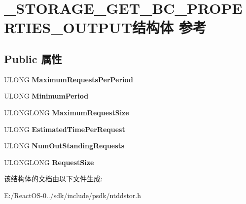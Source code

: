 \hypertarget{struct___s_t_o_r_a_g_e___g_e_t___b_c___p_r_o_p_e_r_t_i_e_s___o_u_t_p_u_t}{}\section{\+\_\+\+S\+T\+O\+R\+A\+G\+E\+\_\+\+G\+E\+T\+\_\+\+B\+C\+\_\+\+P\+R\+O\+P\+E\+R\+T\+I\+E\+S\+\_\+\+O\+U\+T\+P\+U\+T结构体 参考}
\label{struct___s_t_o_r_a_g_e___g_e_t___b_c___p_r_o_p_e_r_t_i_e_s___o_u_t_p_u_t}
\subsection*{Public 属性}
\begin{DoxyCompactItemize}
\item 
\mbox{\label{struct___s_t_o_r_a_g_e___g_e_t___b_c___p_r_o_p_e_r_t_i_e_s___o_u_t_p_u_t_a7eb7df608c5769f332262dba8b2c2fe4}} 
U\+L\+O\+NG {\bfseries Maximum\+Requests\+Per\+Period}
\item 
\mbox{\label{struct___s_t_o_r_a_g_e___g_e_t___b_c___p_r_o_p_e_r_t_i_e_s___o_u_t_p_u_t_a00579ef0c7ecb8bdb8e67627313455f2}} 
U\+L\+O\+NG {\bfseries Minimum\+Period}
\item 
\mbox{\label{struct___s_t_o_r_a_g_e___g_e_t___b_c___p_r_o_p_e_r_t_i_e_s___o_u_t_p_u_t_a24116cab618e5621155d16bd96fcb980}} 
U\+L\+O\+N\+G\+L\+O\+NG {\bfseries Maximum\+Request\+Size}
\item 
\mbox{\label{struct___s_t_o_r_a_g_e___g_e_t___b_c___p_r_o_p_e_r_t_i_e_s___o_u_t_p_u_t_a33b879c04bcf6777e5537c082ef06e6e}} 
U\+L\+O\+NG {\bfseries Estimated\+Time\+Per\+Request}
\item 
\mbox{\label{struct___s_t_o_r_a_g_e___g_e_t___b_c___p_r_o_p_e_r_t_i_e_s___o_u_t_p_u_t_a73c3934bf071803ac0be119d941c5337}} 
U\+L\+O\+NG {\bfseries Num\+Out\+Standing\+Requests}
\item 
\mbox{\label{struct___s_t_o_r_a_g_e___g_e_t___b_c___p_r_o_p_e_r_t_i_e_s___o_u_t_p_u_t_a1dcd86859cb176dc0aa79a4b7e40cfba}} 
U\+L\+O\+N\+G\+L\+O\+NG {\bfseries Request\+Size}
\end{DoxyCompactItemize}


该结构体的文档由以下文件生成\+:\begin{DoxyCompactItemize}
\item 
E\+:/\+React\+O\+S-\/0../sdk/include/psdk/ntddstor.\+h\end{DoxyCompactItemize}

